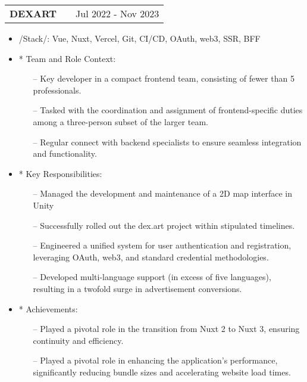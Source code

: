 \documentclass[a4paper,12pt]{article}
\makeatletter
\newenvironment{joblong}[2]
    {
    \begin{tabularx}{\linewidth}{@{}l X r@{}}
    \textbf{#1} & \hfill &  #2 \\[3.75pt]
    \end{tabularx}
    \begin{minipage}[t]{\linewidth}
    \begin{itemize}[nosep,after=\strut, leftmargin=1em, itemsep=3pt,label=--]
    }
    {
    \end{itemize}
    \end{minipage}    
    }
\makeatother
\begin{document}
\begin{joblong}{DEXART}{Jul 2022 - Nov 2023}
  \item /Stack/: {Vue, Nuxt, Vercel, Git, CI/CD, OAuth, web3, SSR, BFF}

  \item [*] Team and Role Context:
\begin{itemize}
  \item [--] Key developer in a compact frontend team, consisting of fewer than 5 professionals. 
  \item [--] Tasked with the coordination and assignment of frontend-specific duties among a three-person subset of the larger team.
  \item [--] Regular connect with backend specialists to ensure seamless integration and functionality.
\end{itemize}

  \item [*] Key Responsibilities:
\begin{itemize}
  \item [--] Managed the development and maintenance of a 2D map interface in Unity
  \item [--] Successfully rolled out the dex.art project within stipulated timelines.
  \item [--] Engineered a unified system for user authentication and registration, leveraging OAuth, web3, and standard credential methodologies.
  \item [--] Developed multi-language support (in excess of five languages), resulting in a twofold surge in advertisement conversions.
\end{itemize}


  \item [*] Achievements:
\begin{itemize}
  \item [--] Played a pivotal role in the transition from Nuxt 2 to Nuxt 3, ensuring continuity and efficiency.
  \item [--] Played a pivotal role in enhancing the application's performance, significantly reducing bundle sizes and accelerating website load times.
\end{itemize}

\end{joblong}
\end{document}
